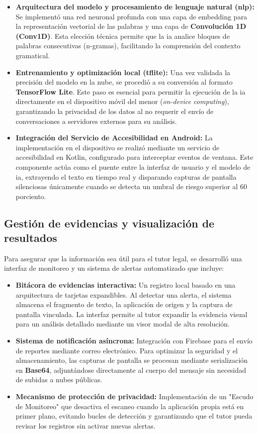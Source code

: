 \begin{itemize}
\item \textbf{Arquitectura del modelo y procesamiento de lenguaje natural (\gls{nlp}):} Se implementó una red neuronal profunda con una capa de embedding para la representación vectorial de las palabras y una capa de \textbf{Convolución 1D (Conv1D)}. Esta elección técnica permite que la \gls{ia} analice bloques de palabras consecutivas (n-gramas), facilitando la comprensión del contexto gramatical.
\item \textbf{Entrenamiento y optimización local (\gls{tflite}):} Una vez validada la precisión del modelo en la nube, se procedió a su conversión al formato \textbf{TensorFlow Lite}. Este paso es esencial para permitir la ejecución de la \gls{ia} directamente en el dispositivo móvil del menor (\textit{on-device computing}), garantizando la privacidad de los datos al no requerir el envío de conversaciones a servidores externos para su análisis.
\item \textbf{Integración del Servicio de Accesibilidad en Android:} La implementación en el dispositivo se realizó mediante un servicio de accesibilidad en Kotlin, configurado para interceptar eventos de ventana. Este componente actúa como el puente entre la interfaz de usuario y el modelo de \gls{ia}, extrayendo el texto en tiempo real y disparando capturas de pantalla silenciosas únicamente cuando se detecta un umbral de riesgo superior al 60 porciento.
\end{itemize}

\subsection{Gestión de evidencias y visualización de resultados}
Para asegurar que la información sea útil para el tutor legal, se desarrolló una interfaz de monitoreo y un sistema de alertas automatizado que incluye:
\begin{itemize}
\item \textbf{Bitácora de evidencias interactiva:} Un registro local basado en una arquitectura de tarjetas expandibles. Al detectar una alerta, el sistema almacena el fragmento de texto, la aplicación de origen y la captura de pantalla vinculada. La interfaz permite al tutor expandir la evidencia visual para un análisis detallado mediante un visor modal de alta resolución.
\item \textbf{Sistema de notificación asíncrona:} Integración con Firebase para el envío de reportes mediante correo electrónico. Para optimizar la seguridad y el almacenamiento, las capturas de pantalla se procesan mediante serialización en \textbf{Base64}, adjuntándose directamente al cuerpo del mensaje sin necesidad de subidas a nubes públicas.
\item \textbf{Mecanismo de protección de privacidad:} Implementación de un "Escudo de Monitoreo" que desactiva el escaneo cuando la aplicación propia está en primer plano, evitando bucles de detección y garantizando que el tutor pueda revisar los registros sin activar nuevas alertas.
\end{itemize}

